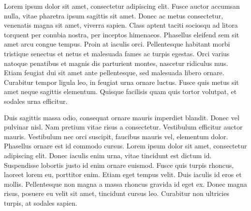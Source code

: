 Lorem ipsum dolor sit amet, consectetur adipiscing elit. Fusce auctor accumsan nulla, vitae pharetra ipsum sagittis sit amet. \cite{Park:2006:DSI, notes2002} Donec ac metus consectetur, venenatis magna sit amet, viverra sapien. Class aptent taciti sociosqu ad litora torquent per conubia nostra, per inceptos himenaeos. Phasellus eleifend sem sit amet arcu congue tempus. Proin at iaculis orci. Pellentesque habitant morbi tristique senectus et netus et malesuada fames ac turpis egestas. Orci varius natoque penatibus et magnis dis parturient montes, nascetur ridiculus mus. \cite{Pellacini:2005:LAH} Etiam feugiat dui sit amet ante pellentesque, sed malesuada libero ornare. Curabitur tempor ligula leo, in feugiat urna ornare luctus. Fusce quis metus sit amet neque sagittis elementum. Quisque facilisis quam quis tortor volutpat, et sodales urna efficitur.



Duis sagittis massa odio, consequat ornare mauris imperdiet blandit. \cite{levoy:2000:TDM} Donec vel pulvinar nisl. Nam pretium vitae risus a consectetur. \cite{sako:2001:SSB, fedkiw:2001:VSO, Jobs95} Vestibulum efficitur auctor mauris. Vestibulum nec orci suscipit, faucibus mauris vel, elementum dolor. Phasellus ornare est id commodo cursus. Lorem ipsum dolor sit amet, consectetur adipiscing elit. Donec iaculis enim urna, vitae tincidunt est dictum id. Suspendisse lobortis justo id enim ornare euismod. Fusce quis turpis rhoncus, laoreet lorem eu, porttitor enim. \cite{kartch:2000:ERA, yee:2000:SSA, parke:1996:CFA} Etiam eget tempus velit. Duis iaculis id eros et mollis. Pellentesque non magna a massa rhoncus gravida id eget ex. Donec magna risus, posuere eu velit sit amet, tincidunt cursus leo. Curabitur non ultricies turpis, at sodales sapien.